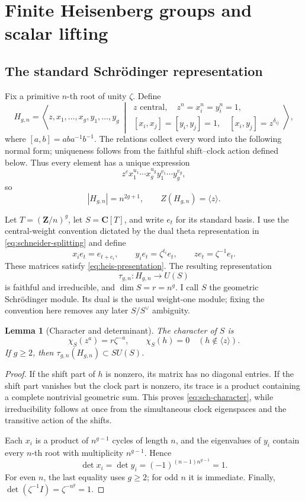 \documentclass[11pt,reqno]{amsart}
\numberwithin{equation}{section}
\newtheorem{lemma}[lemma]{Lemma}
\theoremstyle{remark}
\newcommand{\bC}{\mathbf C}
\newcommand{\bZ}{\mathbf Z}
\begin{document}
\section{Finite Heisenberg groups and scalar lifting}

\subsection{The standard Schr\"odinger representation}

Fix a primitive \(n\)-th root of unity \(\zeta\).  Define
\[
 H_{g,n}=
 \left\langle z,x_1,\ldots,x_g,y_1,\ldots,y_g\ \middle|\
 \begin{array}{c}
 z\text{ central},\quad z^n=x_i^n=y_i^n=1,\\
 {}[x_i,x_j]=[y_i,y_j]=1,\quad [x_i,y_j]=z^{\delta_{ij}}
 \end{array}
 \right\rangle,
\tag{2.1}\label{eq:heis-presentation}
\]
where \([a,b]=aba^{-1}b^{-1}\).  The relations collect every word into
the following normal form; uniqueness follows from the faithful
shift--clock action defined below.  Thus every element has a unique
expression
\[
 z^c x_1^{u_1}\cdots x_g^{u_g}
 y_1^{v_1}\cdots y_g^{v_g},
\]
so
\[
 |H_{g,n}|=n^{2g+1},\qquad Z(H_{g,n})=\langle z\rangle.
\tag{2.2}\label{eq:heis-order}
\]

Let \(T=(\bZ/n)^g\), let \(S=\bC[T]\), and write \(e_t\) for its standard
basis.  I use the central-weight convention dictated by the dual
theta representation in \cref{eq:schneider-splitting} and define
\[
 x_i e_t=e_{t+e_i},\qquad
 y_i e_t=\zeta^{t_i}e_t,\qquad
 z e_t=\zeta^{-1}e_t.
\tag{2.3}\label{eq:schrodinger}
\]
These matrices satisfy \eqref{eq:heis-presentation}.  The resulting
representation
\[
 \tau_{g,n}\colon H_{g,n}\longrightarrow U(S)
\]
is faithful and irreducible, and \(\dim S=r=n^g\).  I call \(S\) the
geometric Schr\"odinger module.  Its dual is the usual weight-one
module; fixing the convention here removes any later \(S/S^\vee\)
ambiguity.

\begin{lemma}[Character and determinant]\label{lem:character}
The character of \(S\) is
\[
 \chi_S(z^a)=r\zeta^{-a},\qquad
 \chi_S(h)=0\quad(h\notin\langle z\rangle).
\tag{2.4}\label{eq:sch-character}
\]
If \(g\geq2\), then \(\tau_{g,n}(H_{g,n})\subset SU(S)\).
\end{lemma}

\begin{proof}
If the shift part of \(h\) is nonzero, its matrix has no diagonal
entries.  If the shift part vanishes but the clock part is nonzero, its
trace is a product containing a complete nontrivial geometric sum.  This
proves \eqref{eq:sch-character}, while irreducibility follows at once
from the simultaneous clock eigenspaces and the transitive action of the
shifts.

Each \(x_i\) is a product of \(n^{g-1}\) cycles of length \(n\), and the
eigenvalues of \(y_i\) contain every \(n\)-th root with multiplicity
\(n^{g-1}\).  Hence
\[
 \det x_i=\det y_i=(-1)^{(n-1)n^{g-1}}=1.
\]
For even \(n\), the last equality uses \(g\geq2\); for odd \(n\) it is
immediate.  Finally, \(\det(\zeta^{-1}I)=\zeta^{-n^g}=1\).
\end{proof}
\end{document}
